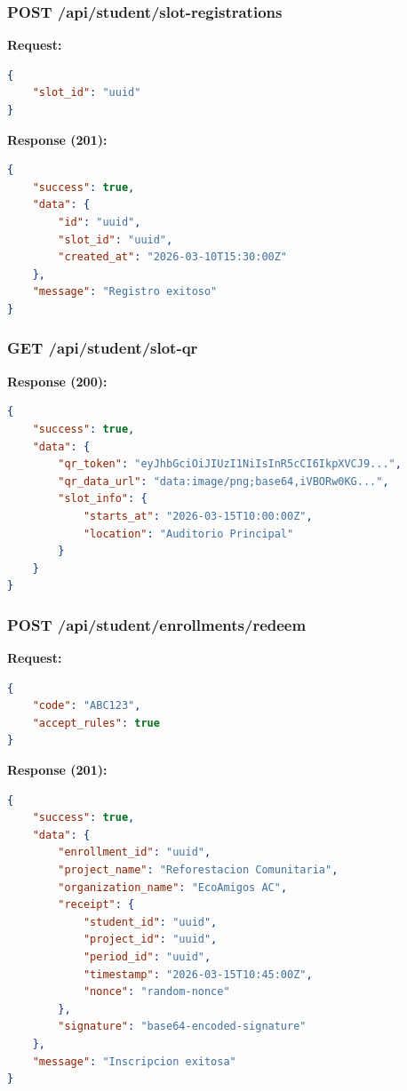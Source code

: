 \documentclass[12pt,a4paper]{article}
\begin{document}
\subsubsection{POST /api/student/slot-registrations}

\textbf{Request:}
\begin{lstlisting}[language=json]
{
    "slot_id": "uuid"
}
\end{lstlisting}

\textbf{Response (201):}
\begin{lstlisting}[language=json]
{
    "success": true,
    "data": {
        "id": "uuid",
        "slot_id": "uuid",
        "created_at": "2026-03-10T15:30:00Z"
    },
    "message": "Registro exitoso"
}
\end{lstlisting}

\subsubsection{GET /api/student/slot-qr}

\textbf{Response (200):}
\begin{lstlisting}[language=json]
{
    "success": true,
    "data": {
        "qr_token": "eyJhbGciOiJIUzI1NiIsInR5cCI6IkpXVCJ9...",
        "qr_data_url": "data:image/png;base64,iVBORw0KG...",
        "slot_info": {
            "starts_at": "2026-03-15T10:00:00Z",
            "location": "Auditorio Principal"
        }
    }
}
\end{lstlisting}

\subsubsection{POST /api/student/enrollments/redeem}

\textbf{Request:}
\begin{lstlisting}[language=json]
{
    "code": "ABC123",
    "accept_rules": true
}
\end{lstlisting}

\textbf{Response (201):}
\begin{lstlisting}[language=json]
{
    "success": true,
    "data": {
        "enrollment_id": "uuid",
        "project_name": "Reforestacion Comunitaria",
        "organization_name": "EcoAmigos AC",
        "receipt": {
            "student_id": "uuid",
            "project_id": "uuid",
            "period_id": "uuid",
            "timestamp": "2026-03-15T10:45:00Z",
            "nonce": "random-nonce"
        },
        "signature": "base64-encoded-signature"
    },
    "message": "Inscripcion exitosa"
}
\end{lstlisting}
\end{document}
